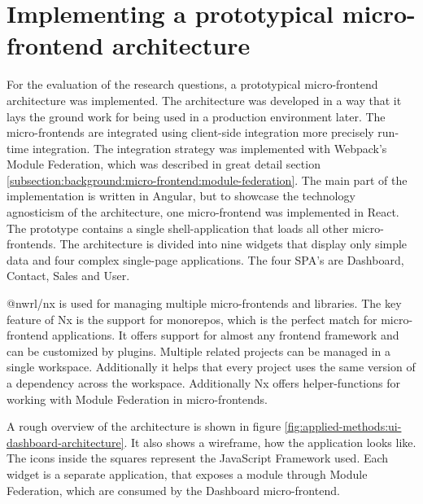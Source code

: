 \section{Implementing a prototypical micro-frontend architecture}\label{section:applied-methods:prototypical-implementation}

For the evaluation of the research questions, a prototypical micro-frontend architecture was implemented. The architecture was developed in a way that it lays the ground work for being used in a production environment later. The micro-frontends are integrated using client-side integration more precisely run-time integration. The integration strategy was implemented with Webpack's Module Federation, which was described in great detail section \ref{subsection:background:micro-frontend:module-federation}. The main part of the implementation is written in Angular, but to showcase the technology agnosticism of the architecture, one micro-frontend was implemented in React. The prototype contains a single shell-application that loads all other micro-frontends. The architecture is divided into nine widgets that display only simple data and four complex single-page applications. The four SPA's are Dashboard, Contact, Sales and User.

\bigskip

\noindent @nwrl/nx is used for managing multiple micro-frontends and libraries. The key feature of Nx is the support for monorepos, which is the perfect match for micro-frontend applications. It offers support for almost any frontend framework and can be customized by plugins. Multiple related projects can be managed in a single workspace. Additionally it helps that every project uses the same version of a dependency across the workspace. Additionally Nx offers helper-functions for working with Module Federation in micro-frontends. \cite{misc::applied-methods:intro-to-nx}

\bigskip

\noindent A rough overview of the architecture is shown in figure \ref{fig:applied-methods:ui-dashboard-architecture}. It also shows a wireframe, how the application looks like. The icons inside the squares represent the JavaScript Framework used. Each widget is a separate application, that exposes a module through Module Federation, which are consumed by the Dashboard micro-frontend.

